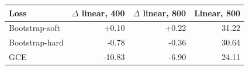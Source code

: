 \begin{tabular}{lrrr}
\toprule
Loss & $\Delta$ linear, 400 & $\Delta$ linear, 800 & Linear, 800 \\
\midrule
Bootstrap-soft & +0.10 & +0.22 & 31.22 \\
Bootstrap-hard & -0.78 & -0.36 & 30.64 \\
GCE & -10.83 & -6.90 & 24.11 \\
\bottomrule
\end{tabular}
